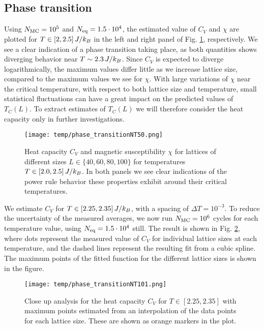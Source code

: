 \subsection{Phase transition}\label{subsec_results:phase_transition}
Using $N_\mathrm{MC}=10^5$ and $N_\mathrm{eq}=1.5\cdot10^4$, the estimated value of $C_V$ and $\chi$ are plotted for $T\in[2,2.5]\,J/k_B$ in the left and right panel of Fig. \ref{fig:phase_transition}, respectively. We see a clear indication of a phase transition taking place, as both quantities shows diverging behavior near $T\sim2.3\,J/k_B$. Since $C_V$ is expected to diverge logarithmically, the maximum values differ little as we increase lattice size, compared to the maximum values we see for $\chi$. With large variations of $\chi$ near the critical temperature, with respect to both lattice size and temperature, small statistical fluctuations can have a great impact on the predicted values of $T_C(L)$. To extract estimates of $T_C(L)$ we will therefore consider the heat capacity only in further investigations. 
\begin{figure*}[!ht]
    \texttt{[image: temp/phase\_transitionNT50.png]} 
    \caption{Heat capacity $C_V$ and magnetic susceptibility $\chi$ for lattices of different sizes $L\in\{40,60,80,100\}$ for temperatures $T\in[2.0,2.5]\,J/k_B$. In both panels we see clear indications of the power rule behavior these properties exhibit around their critical temperatures.}
    \label{fig:phase_transition}
\end{figure*} 

We estimate $C_V$ for $T\in[2.25,2.35]\,J/k_B$, with a spacing of $\Delta T=10^{-3}$. To reduce the uncertainty of the measured averages, we now run $N_\mathrm{MC}=10^6$ cycles for each temperature value, using $N_\mathrm{eq}=1.5\cdot10^4$ still. The result is shown in Fig. \ref{fig:phase_transition_zoomed}, where dots represent the measured value of $C_V$ for individual lattice sizes at each temperature, and the dashed lines represent the resulting fit from a cubic spline. The maximum points of the fitted function for the different lattice sizes is shown in the figure.    
\begin{figure}[!ht]
    \texttt{[image: temp/phase\_transitionNT101.png]} 
    \caption{Close up analysis for the heat capacity $C_V$ for $T\in[2.25, 2.35]$ with maximum points estimated from an interpolation of the data points for each lattice size. These are shown as orange markers in the plot.}
    \label{fig:phase_transition_zoomed}
\end{figure} 

